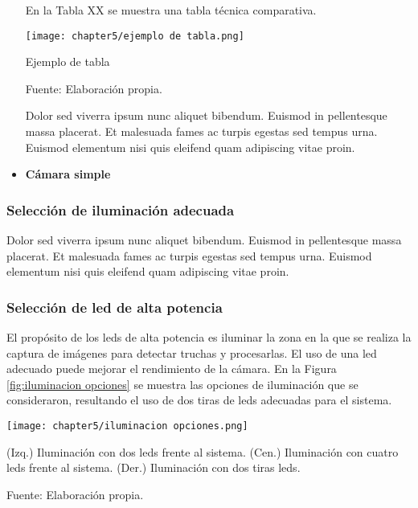 \begin{itemize}
	
	
	En la Tabla XX se muestra una tabla técnica comparativa.
	
	\begin{myfigure}[H]
		\centering
		\texttt{[image: chapter5/ejemplo de tabla.png]}
		\caption{Ejemplo de tabla}
		\begin{myflushleftportland}
			Fuente: Elaboración propia.
		\end{myflushleftportland}
		\label{fig:ejemplo de tabla}
	\end{myfigure}
	
	Dolor sed viverra ipsum nunc aliquet bibendum. Euismod in pellentesque massa placerat. Et malesuada fames ac turpis egestas sed tempus urna. Euismod elementum nisi quis eleifend quam adipiscing vitae proin.
	
	\item \textbf{Cámara simple}
\end{itemize}



\subsubsection{Selección de iluminación adecuada} 


Dolor sed viverra ipsum nunc aliquet bibendum. Euismod in pellentesque massa placerat. Et malesuada fames ac turpis egestas sed tempus urna. Euismod elementum nisi quis eleifend quam adipiscing vitae proin.

\subsubsection{Selección de led de alta potencia}

El propósito de los leds de alta potencia es iluminar la zona en la que se realiza la captura de imágenes para detectar truchas y procesarlas. El uso de una led adecuado puede mejorar el rendimiento de la cámara. En la Figura \ref{fig:iluminacion opciones} se muestra las opciones de iluminación que se consideraron, resultando el uso de dos tiras de leds adecuadas para el sistema.

\begin{myfigure}[H]
	\centering
	\texttt{[image: chapter5/iluminacion opciones.png]}
	\caption[Opciones de posicionamiento de iluminación.]{(Izq.) Iluminación con dos leds frente al sistema. (Cen.) Iluminación con cuatro leds frente al sistema. (Der.) Iluminación con dos tiras leds.}
	\begin{myflushleftportland}
		Fuente: Elaboración propia.
	\end{myflushleftportland}
	\label{fig:iluminacion opciones}
\end{myfigure}


